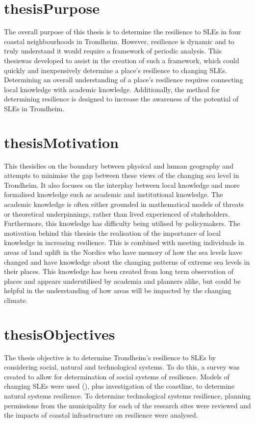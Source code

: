 \paragraph{}

\section{thesisPurpose}
The overall purpose of this thesis is to determine the resilience to SLEs in four coastal neighbourhoods in Trondheim. However, resilience is dynamic and to truly understand it would require a framework of periodic analysis. This thesiswas developed to assist in the creation of such a framework, which could quickly and inexpensively determine a place's resilience to changing SLEs. Determining an overall understanding of a place's resilience requires connecting local knowledge with academic knowledge. Additionally, the method for determining resilience is designed to increase the awareness of the potential of SLEs in Trondheim. 

\section{thesisMotivation}
 This thesislies on the boundary between physical and human geography and attempts to minimise the gap between these views of the changing sea level in Trondheim. It also focuses on the interplay between local knowledge and more formalised knowledge such as academic and institutional knowledge. The academic knowledge is often either grounded in mathematical models of threats or theoretical underpinnings, rather than lived experienced of stakeholders. Furthermore, this knowledge has difficulty being utilised by policymakers. The motivation behind this thesisis the realisation of the importance of local knowledge in increasing resilience. This is combined with meeting individuals in areas of land uplift in the Nordics who have memory of how the sea levels have changed and have knowledge about the changing patterns of extreme sea levels in their places. This knowledge has been created from long term observation of places and appears underutilised by academia and planners alike, but could be helpful in the understanding of how areas will be impacted by the changing climate. 



\section{thesisObjectives}
The thesis objective is to determine Trondheim's resilience to SLEs by considering social, natural and technological systems. To do this, a survey was created to allow for determination of social systems of resilience.  Models of changing SLEs were used (\cite{kartverket_se_2020}), plus investigation of the coastline, to determine natural systems resilience. To determine technological systems resilience, planning permissions from the municipality for each of the research sites were reviewed and the impacts of coastal infrastructure on resilience were analysed.


